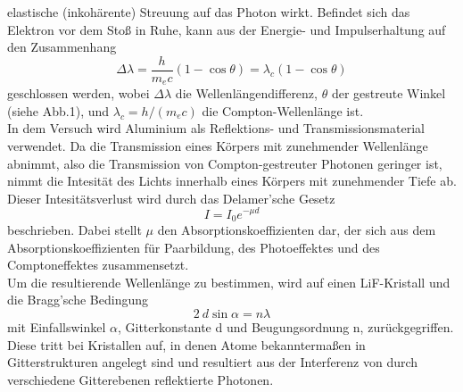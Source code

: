     elastische (inkohärente) Streuung auf das Photon wirkt. Befindet sich das Elektron 
    vor dem Stoß in Ruhe, kann aus der Energie- und Impulserhaltung auf den Zusammenhang
    \begin{equation}
        \Delta \lambda = \dfrac{h}{m_e c}(1-\cos{\theta})=\lambda_c(1-\cos{\theta})
        \label{eqn:compt}
    \end{equation}
    geschlossen werden, wobei $\Delta \lambda$ die Wellenlängendifferenz, $\theta$ der 
    gestreute Winkel (siehe Abb.1), und $\lambda_c=h/(m_e c)$ die Compton-Wellenlänge ist.\\
    In dem Versuch wird Aluminium als Reflektions- und Transmissionsmaterial verwendet.
    Da die Transmission eines Körpers mit zunehmender Wellenlänge abnimmt, also die Transmission
    von Compton-gestreuter Photonen geringer ist, nimmt die Intesität des Lichts innerhalb eines 
    Körpers mit zunehmender Tiefe ab. Dieser Intesitätsverlust wird durch das Delamer'sche Gesetz
    \begin{equation}
        I = I_0 e^{-\mu d}
    \end{equation}
    beschrieben. Dabei stellt $\mu$ den Absorptionskoeffizienten dar, der sich aus dem 
    Absorptionskoeffizienten für Paarbildung, des Photoeffektes und des Comptoneffektes 
    zusammensetzt.\\
    Um die resultierende Wellenlänge zu bestimmen, wird auf einen LiF-Kristall und die Bragg'sche Bedingung
    \begin{equation}
        2 \ d \sin{\alpha} = n\lambda
        \label{eqn:bragg}
    \end{equation}
    mit Einfallswinkel $\alpha$, Gitterkonstante d und Beugungsordnung n, zurückgegriffen.
    Diese tritt bei Kristallen auf, in denen Atome bekanntermaßen in Gitterstrukturen 
    angelegt sind und resultiert aus der Interferenz von durch verschiedene Gitterebenen 
    reflektierte Photonen.

